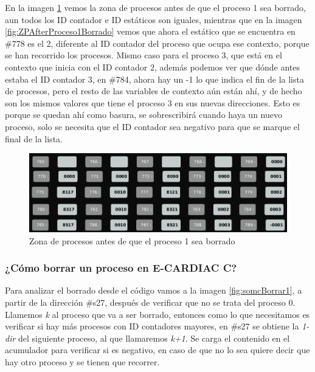 \documentclass[letterpaper,12pt,oneside]{book}
\begin{document}
		En la imagen \ref{fig:ZPBeforeProceso1Terminado} vemos la zona de procesos antes de que el proceso 1 sea borrado, aun todos los ID contador e
		ID estáticos son iguales, mientras que en la imagen \ref{fig:ZPAfterProceso1Borrado} vemos que ahora el estático que se encuentra en
		\#778 es el 2, diferente al ID contador del proceso que ocupa ese contexto, porque se han recorrido los procesos. Mismo caso para el proceso 3,
		que está en el contexto que inicia con el ID contador 2, además podemos ver que dónde antes estaba el ID contador 3, en \#784, ahora
		hay un -1 lo que indica el fin de la lista de procesos, pero el resto de las variables de contexto aún están ahí, y de hecho son los mismos valores
		que tiene el proceso 3 en sus nuevas direcciones. Esto es porque se quedan ahí como basura, se sobrescribirá cuando haya un nuevo proceso, solo se necesita
		que el ID contador sea negativo para que se marque el final de la lista.
		
		\begin{figure}[h]		
			\centering
			\includegraphics[scale=0.45]{media/CARDIACC/ZPBeforeProceso1Terminado.png}
			\caption{ Zona de procesos antes de que el proceso 1 sea borrado }
			\label{fig:ZPBeforeProceso1Terminado}
		\end{figure}
		
		
		\subsubsection{¿Cómo borrar un proceso en E-CARDIAC C?}
		
		
		Para analizar el borrado desde el código  vamos a la imagen \ref{fig:somcBorrar1}, a partir de la dirección \#s27, después
		de verificar que no se trata del proceso 0. Llamemos \textit{k} al proceso que va a ser borrado, entonces como lo que necesitamos
		es verificar si hay más procesos con ID contadores mayores, en \#s27
		se obtiene la \textit{1-dir} del siguiente proceso, al que llamaremos \textit{k+1}.
		Se carga el contenido en el acumulador para
		verificar si es negativo, en caso de que no lo sea quiere decir que hay otro proceso y se tienen que recorrer.
		
\end{document}
